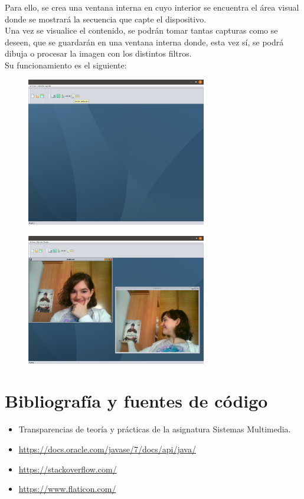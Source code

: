 \documentclass[11pt,a4paper]{article}
\begin{document}
Para ello, se crea una ventana interna en cuyo interior se encuentra el área visual donde se mostrará la secuencia que capte el dispositivo.\\

Una vez se visualice el contenido, se podrán tomar tantas capturas como se deseen, que se guardarán en una ventana interna donde, esta vez sí, se podrá dibuja o procesar la imagen con los distintos filtros.\\

Su funcionamiento es el siguiente:\\

\begin{figure}[H]
\centering
	\includegraphics[width=0.7\textwidth]{img/webcam.png}
\end{figure}

\begin{figure}[H]
\centering
	\includegraphics[width=0.7\textwidth]{img/captura.png}
\end{figure}

\newpage

\section{Bibliografía y fuentes de código}
\begin{itemize}
	\item Transparencias de teoría y prácticas de la asignatura Sistemas Multimedia.
	\item \textcolor{blue}{\url{https://docs.oracle.com/javase/7/docs/api/java/}}
	\item \textcolor{blue}{\url{https://stackoverflow.com/}}
	\item \textcolor{blue}{\url{https://www.flaticon.com/}}
\end{itemize}
\end{document}
